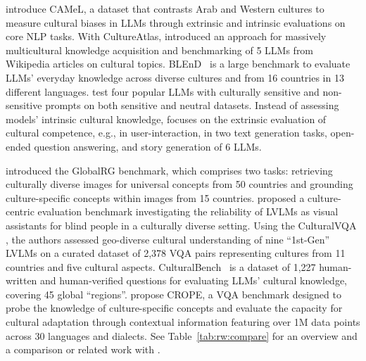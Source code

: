 %
\citet{naous-etal-2024-beer} introduce CAMeL, a dataset that contrasts Arab and Western cultures to measure cultural biases in LLMs through extrinsic and intrinsic evaluations on core NLP tasks.
%
With CultureAtlas, \citet{fung2024massively} introduced an approach for massively multicultural knowledge acquisition and benchmarking of 5 LLMs from Wikipedia articles on cultural topics.
%
BLEnD~\cite{myung2024blend} is a large benchmark to evaluate LLMs' everyday knowledge across diverse cultures and from 16 countries in 13 different languages.
%
\cite{mukherjee-etal-2024-cultural} test four popular LLMs with culturally sensitive and non-sensitive prompts on both sensitive and neutral datasets.
%
Instead of assessing models' intrinsic cultural knowledge, \cite{bhatt-diaz-2024-extrinsic} focuses on the extrinsic evaluation of cultural competence, e.g., in user-interaction, in two text generation tasks, open-ended question answering, and story generation of 6 LLMs.
%

%
%
\citet{bhatia-etal-2024-local} introduced the GlobalRG benchmark, which comprises two tasks: retrieving culturally diverse images for universal concepts from 50 countries and grounding culture-specific concepts within images from 15 countries.
%
\citet{karamolegkou-etal-2024-vision} proposed a culture-centric evaluation benchmark investigating the reliability of LVLMs as visual assistants for blind people in a culturally diverse setting. 
%
Using the CulturalVQA \cite{nayak-etal-2024-benchmarking}, the authors assessed geo-diverse cultural understanding of nine ``1st-Gen'' LVLMs on a curated dataset of 2,378 VQA pairs representing cultures from 11 countries and five cultural aspects.
%
CulturalBench~\cite{chiu2024culturalbench} is a dataset of 1,227 human-written and human-verified questions for evaluating LLMs' cultural knowledge, covering 45 global ``regions''.
%
\citet{nikandrou2024crope} propose CROPE, a VQA benchmark designed to probe the knowledge of culture-specific concepts and evaluate the capacity for cultural adaptation through contextual information featuring over 1M data points across 30 languages and dialects.%
%
See Table~\ref{tab:rw:compare} for an overview and a comparison or related work with \dsname.
%

